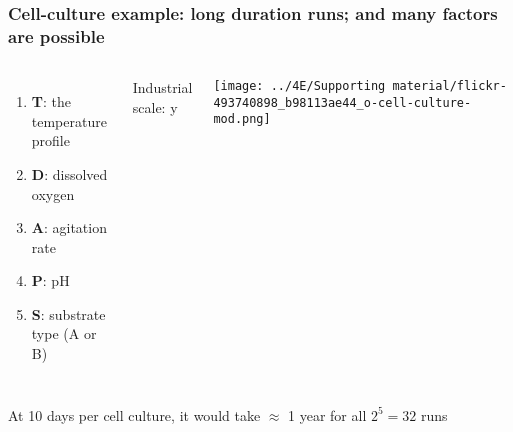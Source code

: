 \begin{frame}\frametitle{Cell-culture example: long duration runs; and many factors are possible}
	\newcommand{\white}{\color{white}}
	\begin{columns}[c]
			\begin{enumerate}
				\item	\textbf{T}: the temperature profile
				\item	\textbf{D}: dissolved oxygen
				\item	\textbf{A}: agitation rate
				\item	\textbf{P}: pH
				\item	\textbf{S}: substrate type (A or B)
			\end{enumerate}
		
			{\color{blue} \small Industrial scale: {\color{white}y}}   
			
			\vspace{0.2cm}
			
			\centerline{\texttt{[image: ../4E/Supporting material/flickr-493740898\_b98113ae44\_o-cell-culture-mod.png]}}
	\end{columns}

	\vfill
	At 10 days per cell culture, it would take $\approx$ 1 year for all $2^5 = 32$ runs
	
\end{frame}

